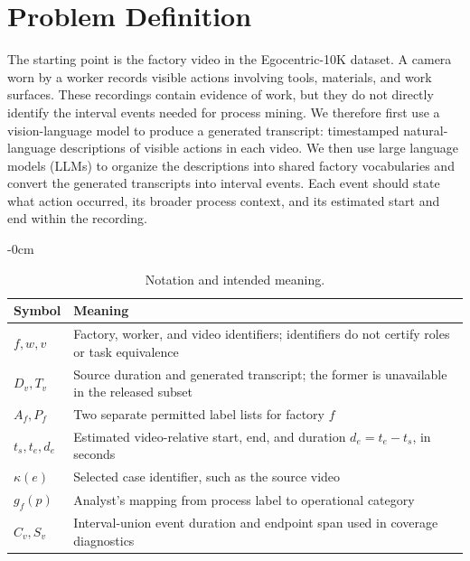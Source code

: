 \section{Problem Definition}
\label{sec:problem}
The starting point is the factory video in the Egocentric-10K dataset. A camera worn by a worker records visible actions involving tools, materials, and work surfaces. These recordings contain evidence of work, but they do not directly identify the interval events needed for process mining. We therefore first use a vision-language model to produce a generated transcript: timestamped natural-language descriptions of visible actions in each video. We then use large language models (LLMs) to organize the descriptions into shared factory vocabularies and convert the generated transcripts into interval events. Each event should state what action occurred, its broader process context, and its estimated start and end within the recording.

\begin{nextpagetopfloat}
\begin{table}[!t]\begin{adjustwidth}{-\extralength}{0cm}
\caption{Notation and intended meaning.}\label{tab:notation}\small
\begin{tabularx}{\linewidth}{@{}lL@{}}\toprule
Symbol & Meaning \\\midrule
$f,w,v$ & Factory, worker, and video identifiers; identifiers do not certify roles or task equivalence \\
$D_v,T_v$ & Source duration and generated transcript; the former is unavailable in the released subset \\
$A_f,P_f$ & Two separate permitted label lists for factory $f$ \\
$t_s,t_e,d_e$ & Estimated video-relative start, end, and duration $d_e=t_e-t_s$, in seconds \\
$\kappa(e)$ & Selected case identifier, such as the source video \\
$g_f(p)$ & Analyst's mapping from process label to operational category \\
$C_v,S_v$ & Interval-union event duration and endpoint span used in coverage diagnostics \\
\bottomrule\end{tabularx}
\end{adjustwidth}\end{table}
\end{nextpagetopfloat}

